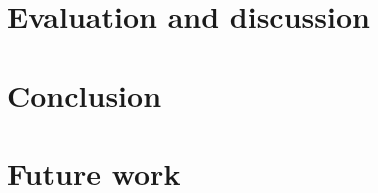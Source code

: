 \documentclass[USenglish]{uit-thesis}
\begin{document}
\chapter{Evaluation and discussion}


\chapter{Conclusion}


\chapter{Future work}


\printbibliography

% 

\backmatter
\end{document}
